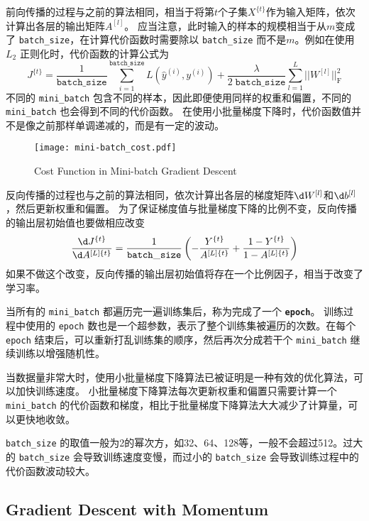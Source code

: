 前向传播的过程与之前的算法相同，相当于将第$t$个子集$X^{\{t\}}$作为输入矩阵，依次计算出各层的输出矩阵$A^{[l]}$。
应当注意，此时输入的样本的规模相当于从$m$变成了 \verb|batch_size|，在计算代价函数时需要除以 \verb|batch_size| 而不是$m$。例如在使用 $L_2$ 正则化时，代价函数的计算公式为
\begin{equation}
    J^{\{t\}} = \frac{1}{\mathtt{batch\_size}}\sum_{i=1}^\mathtt{batch\_size} L(\hat{y}^{(i)}, y^{(i)}) + \frac{\lambda}{2\;\mathtt{batch\_size}}\sum_{l=1}^L||W^{[l]}||_{\mathrm{F}}^2
\end{equation}
不同的 \verb|mini_batch| 包含不同的样本，因此即便使用同样的权重和偏置，不同的 \verb|mini_batch| 也会得到不同的代价函数。
在使用小批量梯度下降时，代价函数值并不是像之前那样单调递减的，而是有一定的波动。

\begin{figure}[h!bt]
    \centering
    \texttt{[image: mini-batch\_cost.pdf]}
    \caption{Cost Function in Mini-batch Gradient Descent}
    \label{fig:mini-batch_cost}
\end{figure}

反向传播的过程也与之前的算法相同，依次计算出各层的梯度矩阵$\d W^{[l]}$和$\d b^{[l]}$，然后更新权重和偏置。
为了保证梯度值与批量梯度下降的比例不变，反向传播的输出层初始值也要做相应改变
\begin{equation}
    \frac{\d J^{\{t\}}}{\d A^{[L]\{t\}}} 
    = \frac{1}{\mathtt{batch\_size}} \left(-\frac{Y^{\{t\}}}{A^{[L]\{t\}}} + \frac{1 - Y^{\{t\}}}{1 - A^{[L]\{t\}}}\right)
\end{equation}
如果不做这个改变，反向传播的输出层初始值将存在一个比例因子，相当于改变了学习率。

当所有的 \verb|mini_batch| 都遍历完一遍训练集后，称为完成了一个 \texttt{\textbf{epoch}}。
训练过程中使用的 \verb|epoch| 数也是一个超参数，表示了整个训练集被遍历的次数。在每个 \verb|epoch| 结束后，可以重新打乱训练集的顺序，然后再次分成若干个 \verb|mini_batch| 继续训练以增强随机性。

当数据量非常大时，使用小批量梯度下降算法已被证明是一种有效的优化算法，可以加快训练速度。
小批量梯度下降算法每次更新权重和偏置只需要计算一个 \verb|mini_batch| 的代价函数和梯度，相比于批量梯度下降算法大大减少了计算量，可以更快地收敛。

\verb|batch_size| 的取值一般为2的幂次方，如32、64、128等，一般不会超过512。过大的 \verb|batch_size| 会导致训练速度变慢，而过小的 \verb|batch_size| 会导致训练过程中的代价函数波动较大。

\subsection{Gradient Descent with Momentum}

